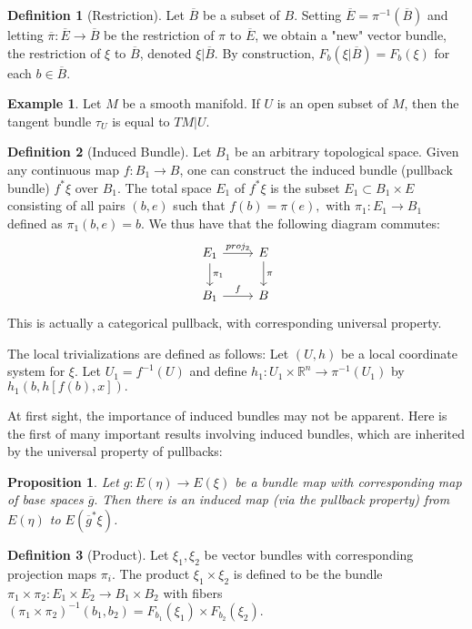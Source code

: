 \documentclass{article}
\newtheorem{prop}{Proposition}[section]
\theoremstyle{definition}
\newtheorem{ex}{Example}[section]
\newtheorem{defn}{Definition}[section]
\newcommand{\R}{\mathbb{R}}
\begin{document}
\begin{defn}[Restriction]
Let $\overline{B}$ be a subset of $B$. Setting $\overline{E}=\pi^{-1}(\overline{B})$ and letting $\overline{\pi}:\overline{E}\rightarrow \overline{B}$ be the restriction of $\pi$ to $\overline{E}$, we obtain a "new" vector bundle, the restriction of $\xi$ to $\overline{B}$, denoted $\xi| \overline{B}.$ By construction, $F_{b}(\xi| \overline{B})=F_{b}(\xi)$ for each $b\in\overline{B}.$
\end{defn}
\begin{ex}
Let $M$ be a smooth manifold. If $U$ is an open subset of $M$, then the tangent bundle $\tau_{U}$ is equal to $TM|{U}.$
\end{ex}
\begin{defn}[Induced Bundle]
Let $B_{1}$ be an arbitrary topological space. Given any continuous map $f:B_{1}\rightarrow B$, one can construct the induced bundle (pullback bundle) $f^{*}\xi$ over $B_{1}$. The total space $E_{1}$ of $f^{*}\xi$ is the subset $E_{1}\subset B_{1}\times E$ consisting of all pairs $(b,e)$ such that  $f(b)=\pi(e),$ with $\pi_{1}:E_{1}\rightarrow B_{1}$ defined as $\pi_{1}(b,e)=b$. We thus have that the following diagram commutes:
\[
\begin{tikzcd}
E_{1}\arrow[d,"\pi_{1}"]\arrow[r,"proj_{2}"] &E\arrow[d,"\pi"]\\
B_{1}\arrow[r,"f"] &B
\end{tikzcd}
\]
This is actually a categorical pullback, with corresponding universal property.

The local trivializations are defined as follows:
Let $(U,h)$ be a local coordinate system for $\xi$. Let $U_{1}=f^{-1}(U)$ and define $h_{1}:U_{1}\times\R^{n}\rightarrow\pi^{-1}(U_{1})$ by $h_{1}(b,h[f(b),x]).$
\end{defn}
At first sight, the importance of induced bundles may not be apparent. Here is the first of many important results involving induced bundles, which are inherited by the universal property of pullbacks:
\begin{prop}
Let $g:E(\eta)\rightarrow E(\xi)$ be a bundle map with corresponding map of base spaces $\overline{g}.$ Then there is an induced map (via the pullback property) from $E(\eta)$ to $E(\overline{g}^{*}\xi)$. 
\end{prop}
\begin{defn}[Product]
Let $\xi_{1},\xi_{2}$ be vector bundles with corresponding projection maps $\pi_{i}.$ The product $\xi_{1}\times\xi_{2}$ is defined to be the bundle $\pi_{1}\times\pi_{2}:E_{1}\times E_{2}\rightarrow B_{1}\times B_{2}$ with fibers $(\pi_{1}\times\pi_{2})^{-1}(b_{1},b_{2})=F_{b_{1}}(\xi_{1})\times F_{b_{2}}(\xi_{2}).$
\end{defn}
\end{document}
